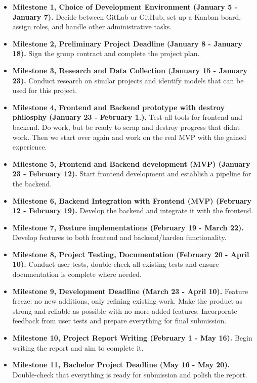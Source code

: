 \begin{itemize}
    \item \textbf{Milestone 1, Choice of Development Environment (January 5 - January 7).} Decide between GitLab or GitHub, set up a Kanban board, assign roles, and handle other administrative tasks.
    \item \textbf{Milestone 2, Preliminary Project Deadline (January 8 - January 18).} Sign the group contract and complete the project plan.
    \item \textbf{Milestone 3, Research and Data Collection (January 15 - January 23).} Conduct research on similar projects and identify models that can be used for this project.
    \item \textbf{Milestone 4, Frontend and Backend prototype with destroy philosphy (January 23 - February 1.).} Test all tools for frontend and backend. Do work, but be ready to scrap and destroy progress that didnt work. Then we start over again and work on the real MVP with the gained experience.
    \item \textbf{Milestone 5, Frontend and Backend development (MVP) (January 23 - February 12).} Start frontend development and establish a pipeline for the backend.
    \item \textbf{Milestone 6, Backend Integration with Frontend (MVP) (February 12 - February 19).} Develop the backend and integrate it with the frontend.
    \item \textbf{Milestone 7, Feature implementations (February 19 - March 22).} Develop features to both frontend and backend/harden functionality.
    \item \textbf{Milestone 8, Project Testing, Documentation (February 20 - April 10).} Conduct user tests, double-check all existing tests and ensure documentation is complete where needed.
    \item \textbf{Milestone 9, Development Deadline (March 23 - April 10).} Feature freeze: no new additions, only refining existing work. Make the product as strong and reliable as possible with no more added features. Incorporate feedback from user tests and prepare everything for final submission.
    \item \textbf{Milestone 10, Project Report Writing (February 1 - May 16).} Begin writing the report and aim to complete it.
    \item \textbf{Milestone 11, Bachelor Project Deadline (May 16 - May 20).} Double-check that everything is ready for submission and polish the report.
\end{itemize}

